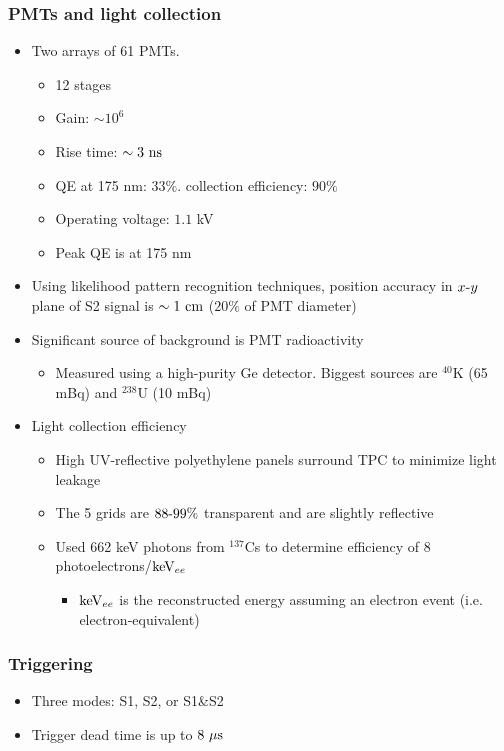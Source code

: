 \subsubsection{PMTs and light collection}
\begin{itemize}
  \item Two arrays of 61 PMTs. 
  \begin{itemize}
    \item 12 stages
    \item Gain: $\sim 10^6$
    \item Rise time:  $\sim 3~\text{ns}$
    \item QE at 175 nm: $33\%$. collection efficiency: $90\%$
    \item Operating voltage: $1.1$ kV
    \item Peak QE is at 175 nm
  \end{itemize}
  \item Using likelihood pattern recognition techniques, position accuracy in $x\textto y$ plane of S2 signal is $\sim 1~\text{cm}$ ($20\%$ of PMT diameter)
  \item Significant source of background is PMT radioactivity
  \begin{itemize}
    \item Measured using a high-purity Ge detector. Biggest sources are $^{40}$K (65 mBq) and $^{238}$U (10 mBq)
  \end{itemize}
  \item Light collection efficiency
  \begin{itemize}
    \item High UV-reflective polyethylene panels surround TPC to minimize light leakage
    \item The 5 grids are $88\textto99\%$ transparent and are slightly reflective
    \item Used 662 keV photons from $^{137}$Cs to determine efficiency of 8 photoelectrons/$\text{keV}_{ee}$
    \begin{itemize}
      \item $\text{keV}_{ee}$ is the reconstructed energy assuming an electron event (i.e. electron-equivalent)
    \end{itemize}
  \end{itemize}
\end{itemize}

\subsubsection{Triggering}
\begin{itemize}
  \item Three modes: S1, S2, or S1\&S2
  \item Trigger dead time is up to $8~\mu\text{s}$
\end{itemize}

